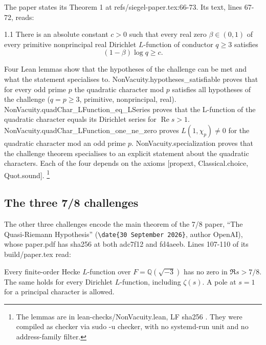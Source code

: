 The paper states its Theorem 1 at refs/siegel-paper.tex:66-73. %
Its text, lines 67-72, reads: %
\begin{paperquote}{1.1}
There is an absolute constant $c>0$ such that every real zero
$\beta\in(0,1)$ of every primitive nonprincipal real Dirichlet
$L$-function of conductor $q\ge3$ satisfies
\begin{equation}\label{eq:main}
 (1-\beta)\log q\ge c.
\end{equation}
\end{paperquote}

Four Lean lemmas show that the hypotheses of the challenge can be met and what the statement specialises to. %
NonVacuity.hypotheses\_satisfiable proves that for every odd prime $p$ the quadratic character mod $p$ satisfies all hypotheses of the challenge ($q = p \ge 3$, primitive, nonprincipal, real). %
NonVacuity.quadChar\_LFunction\_eq\_LSeries proves that the L-function of the quadratic character equals its Dirichlet series for $\operatorname{Re} s > 1$. %
NonVacuity.quadChar\_LFunction\_one\_ne\_zero proves $L(1, \chi_p) \ne 0$ for the quadratic character mod an odd prime $p$. %
NonVacuity.specialization proves that the challenge theorem specialises to an explicit statement about the quadratic characters. %
Each of the four depends on the axioms [propext, Classical.choice, Quot.sound]. %
\footnote{The lemmas are in lean-checks/NonVacuity.lean, LF sha256 . %
They were compiled as checker via sudo -u checker, with no systemd-run unit and no address-family filter. %
}

\subsection{The three 7/8 challenges}

The other three challenges encode the main theorem of the 7/8 paper, ``The Quasi-Riemann Hypothesis'' \cite{openai-qrh-2026} (\texttt{\textbackslash date\{30 September 2026\}}, author OpenAI), whose paper.pdf has sha256  at both adc7f12 and fd4aeeb. %
Lines 107-110 of its build/paper.tex read: %
\begin{paperquote}{}
Every finite-order Hecke $L$-function over
$F=\mathbb Q(\sqrt{-3})$ has no zero in $\Re s>7/8$.
The same holds for every Dirichlet $L$-function, including $\zeta(s)$.
A pole at $s=1$ for a principal character is allowed.
\end{paperquote}

